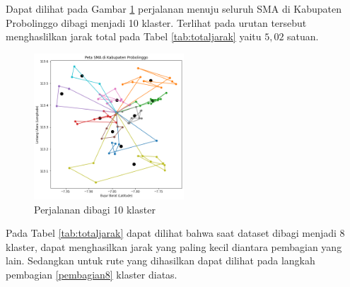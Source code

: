 Dapat dilihat pada Gambar \ref{fig:hasil_mtsp10} perjalanan menuju seluruh SMA di Kabupaten Probolinggo dibagi menjadi 10 klaster. Terlihat pada urutan tersebut menghaslilkan jarak total pada Tabel \ref{tab:totaljarak} yaitu $5,02$ satuan.

\begin{figure}[H]
\centering
\includegraphics[width=0.5\textwidth]{Gambar/hasil_mtsp/10}
\caption{Perjalanan dibagi 10 klaster}
\label{fig:hasil_mtsp10}
\end{figure}

Pada Tabel \ref{tab:totaljarak} dapat dilihat bahwa saat dataset dibagi menjadi 8 klaster, dapat menghasilkan jarak yang paling kecil diantara pembagian yang lain. Sedangkan untuk rute yang dihasilkan dapat dilihat pada langkah pembagian \ref{pembagian8} klaster diatas.

